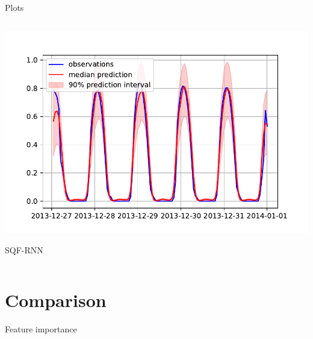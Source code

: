 \documentclass[10pt,aspectratio=169]{beamer}
\begin{document}
\begin{frame}{Plots}
\begin{columns}
\begin{column}{0.33\textwidth}
            \includegraphics[width=\textwidth]{plots/sqf_rnn_plot_9.pdf}
            \begin{center}
                SQF-RNN
            \end{center}
        \end{column}
    \end{columns}
\end{frame}

\section{Comparison}

\begin{frame}{Feature importance}
    \begin{center}
        
    \end{center}
\end{frame}
\end{document}
